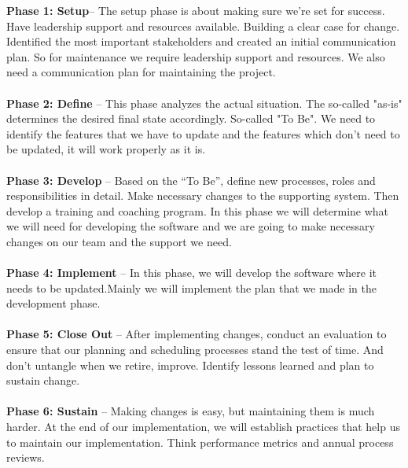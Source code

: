 \documentclass[14pt,a4paper,calibribody]{article}
\begin{document}
\textbf{Phase 1: Setup}– The setup phase is about making sure we’re set for success. Have leadership support and resources available. Building a clear case for change. Identified the most important stakeholders and created an initial communication plan.
So for maintenance we require leadership support and resources. We also need a communication plan for maintaining the project. \\\\
\textbf{Phase 2: Define} – This phase analyzes the actual situation. The so-called "as-is" determines the desired final state accordingly. So-called "To Be".
We need to identify the features that we have to update and the features which don’t need to be updated, it will work properly as it is.\\\\
\textbf{Phase 3: Develop} – Based on the “To Be”, define new processes, roles and responsibilities in detail. Make necessary changes to the supporting system. Then develop a training and coaching program. In this phase we will determine what we will need for developing the software and we are going to make necessary changes on our team and the support we need.\\\\
\textbf{Phase 4: Implement} – In this phase, we will develop the software where it needs to be updated.Mainly we will implement the plan that we made in the development phase.\\\\
\textbf{Phase 5: Close Out} – After implementing changes, conduct an evaluation to ensure that our planning and scheduling processes stand the test of time. And don't untangle when we retire, improve. Identify lessons learned and plan to sustain change.\\\\

\textbf{Phase 6: Sustain} – Making changes is easy, but maintaining them is much harder. At the end of our implementation, we will establish practices that help us to maintain our implementation. Think performance metrics and annual process reviews.\\
\end{document}
